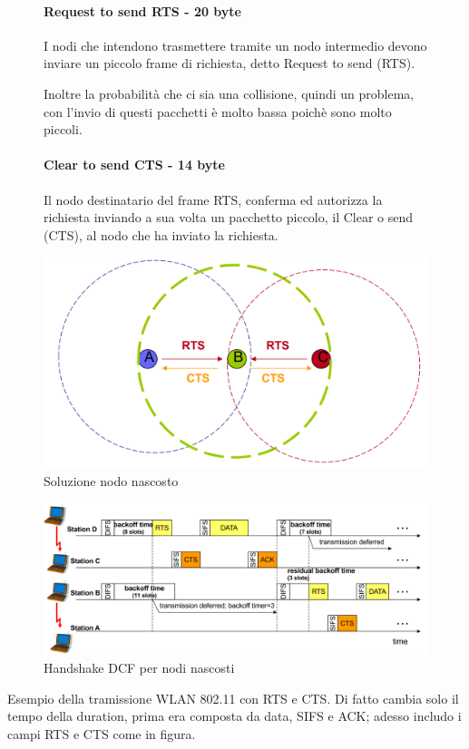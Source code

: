 \begin{figure}[h!]
    \centering
    \begin{minipage}{0.5\textwidth}
\paragraph{Request to send RTS - 20 byte}
I nodi che intendono trasmettere tramite un nodo intermedio devono inviare un piccolo frame di richiesta, detto Request to send (RTS).

Inoltre la probabilità che ci sia una collisione, quindi un problema, con l'invio di questi pacchetti è molto bassa poichè sono molto piccoli.

\paragraph{Clear to send CTS - 14 byte}
Il nodo destinatario del frame RTS, conferma ed autorizza la richiesta inviando a sua volta un pacchetto piccolo, il Clear o send (CTS),  al nodo che ha inviato la richiesta.
    \end{minipage}
    \hfill
    \begin{minipage}{0.49\textwidth}
        \includegraphics[width=\linewidth]{images/soluzionenodonascosto.png}
    \end{minipage}
    \caption{Soluzione nodo nascosto}
    \label{fig:soluzionenodonascosto}
\end{figure}

\begin{figure}[h!]
    \centering
    \includegraphics[scale=0.2]{images/dcfhandshake.png}
    \caption{Handshake DCF per nodi nascosti}
    \label{fig:dcfhandshake}
\end{figure}
Esempio della tramissione WLAN  802.11 con RTS e CTS. Di fatto cambia solo il tempo della duration, prima era composta da data, SIFS e ACK; adesso includo i campi RTS e CTS come in figura.


